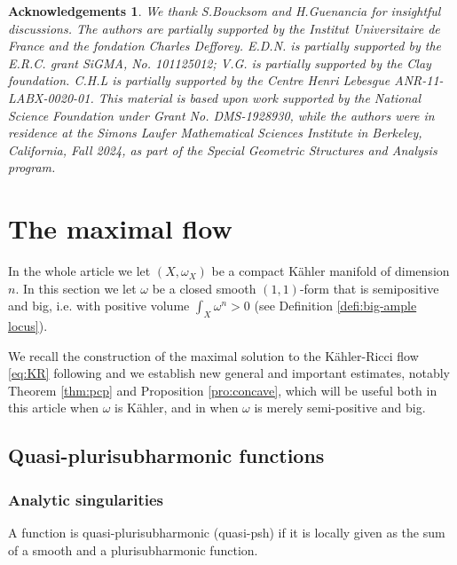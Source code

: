 \documentclass[10pt,a4paper]{amsart}
\numberwithin{equation}{section}
\newtheorem*{ackn}{Acknowledgements}
\begin{document}
 

\begin{ackn} 
We thank S.Boucksom and H.Guenancia for insightful discussions.
The authors are partially supported by the Institut Universitaire de France
and the fondation Charles Defforey. 
E.D.N. is partially supported by the E.R.C. grant SiGMA, No. 101125012;
V.G. is partially supported by the Clay foundation. C.H.L is partially supported by the Centre Henri Lebesgue ANR-11-LABX-0020-01.
This material is based upon work supported by the National Science Foundation under Grant No. DMS-1928930, while the authors were in residence at the Simons Laufer Mathematical Sciences Institute in Berkeley, California, Fall 2024,
as part of the Special Geometric Structures and Analysis program.  
\end{ackn}










\section{The maximal flow} \label{sec:maxflow}


In the whole article we let $(X,\omega_X)$ be a compact K\"ahler manifold of dimension $n$. 
In this section we let $\omega$ be a closed smooth $(1,1)$-form that is semipositive and big,
i.e. with positive volume $\int_X \omega^n>0$ (see Definition \ref{defi:big-ample locus}).

We recall the construction of the maximal solution to the K\"ahler-Ricci flow \eqref{eq:KR}
following \cite{GZ17,DNL17,Dan25} and we establish new general and important estimates,
notably Theorem \ref{thm:pcp} and Proposition \ref{pro:concave}, which will be useful
both in this article when $\omega$ is K\"ahler, and in \cite{DGL26} when 
$\omega$ is merely semi-positive and big.

 

\subsection{Quasi-plurisubharmonic functions}
 

\subsubsection*{Analytic singularities}


  A function is quasi-plurisub\-harmonic (quasi-psh) if it is locally given as the sum of  a smooth and a plurisubharmonic function.   
 
\end{document}
